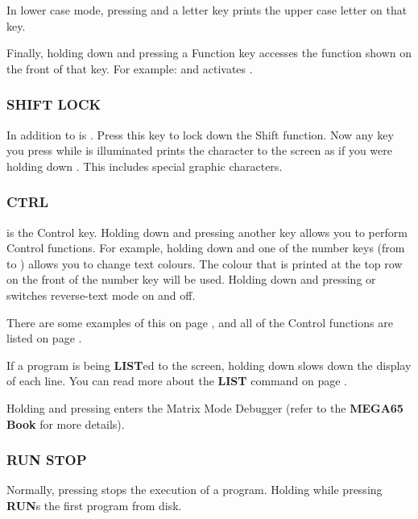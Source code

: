 In lower case mode, pressing  and a letter key prints the upper case letter on that key.

Finally, holding  down and pressing a Function key accesses the function shown on the front of that key. For example:  and  activates .


\subsubsection{SHIFT LOCK}
In addition to  is . Press this key to lock down the Shift function. Now any key you press while  is illuminated prints the character to the screen as if you were holding down . This includes special graphic characters.

\subsubsection{CTRL}
 is the Control key. Holding down  and pressing another key allows you to perform Control functions. For example, holding down  and one of the number keys (from  to ) allows you to change text colours. The colour that is printed at the top row on the front of the number key will be used. Holding down  and pressing  or  switches reverse-text mode on and off.

There are some examples of this on page \pageref{sec:screen-editor}, and all of the Control functions are listed on page \pageref{appendix:controlcodes}.

If a program is being {\bf LIST}ed to the screen, holding down  slows down the display of each line. You can read more about the {\bf LIST} command on page \pageref{BASIC 65 Commands!LIST}.

Holding  and pressing \megakey{*} enters the Matrix Mode Debugger (refer to the {\bf MEGA65 Book} for more details).

\subsubsection{RUN STOP}
Normally, pressing  stops the execution of a program. Holding  while pressing  {\bf RUN}s the first program from disk.

